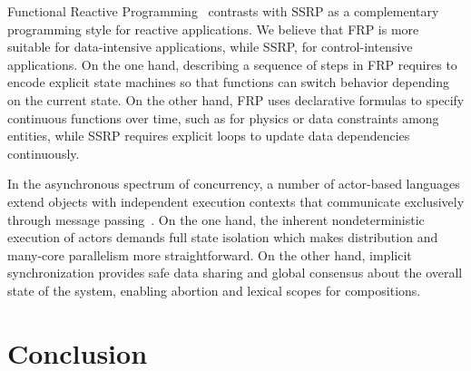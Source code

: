 \documentclass{sigplanconf}
\newcommand{\1}{\;}
\newcommand{\2}{\;\;}
\newcommand{\3}{\;\;\;}
\newcommand{\5}{\;\;\;\;\;}
\begin{document}
Functional Reactive Programming~\cite{frp.principles} contrasts with SSRP as a
complementary programming style for reactive applications.
%
We believe that FRP is more suitable for data-intensive applications, while 
SSRP, for control-intensive applications.
%
On the one hand, describing a sequence of steps in FRP requires to encode 
explicit state machines so that functions can switch behavior depending on the 
current state.
%
On the other hand, FRP uses declarative formulas to specify continuous 
functions over time, such as for physics or data constraints among entities, 
while SSRP requires explicit loops to update data dependencies continuously.

In the asynchronous spectrum of concurrency, a number of actor-based languages 
extend objects with independent execution contexts that communicate exclusively 
through message 
passing~\cite{agha.salsa,actors.thorn,actors.jcobox,actors.capsule}.
%
On the one hand, the inherent nondeterministic execution of actors demands full 
state isolation which makes distribution and many-core parallelism more 
straightforward.
%
On the other hand, implicit synchronization provides safe data sharing and 
global consensus about the overall state of the system, enabling abortion and 
lexical scopes for compositions.

\section{Conclusion}
\label{sec.conclusion}
\end{document}
